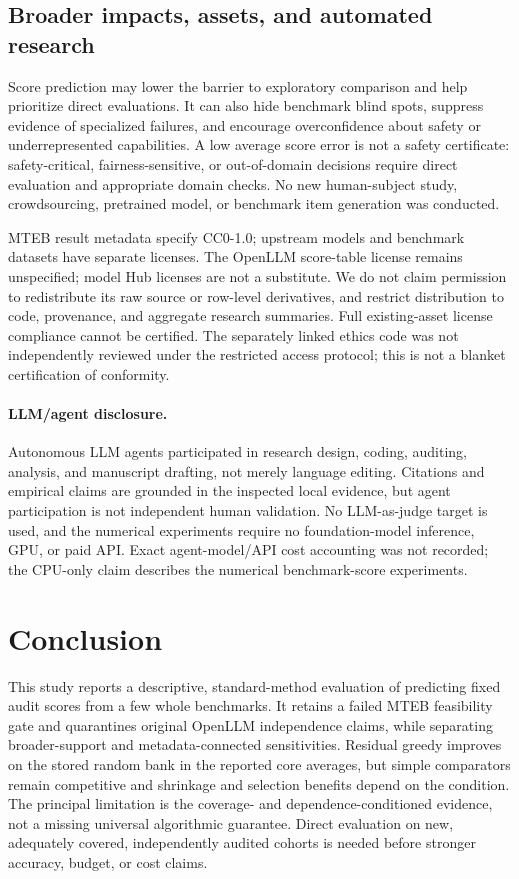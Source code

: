 \documentclass{article}
\begin{document}
\subsection{Broader impacts, assets, and automated research}\label{sec:ethics}
Score prediction may lower the barrier to exploratory comparison and help prioritize direct evaluations. It can also hide benchmark blind spots, suppress evidence of specialized failures, and encourage overconfidence about safety or underrepresented capabilities. A low average score error is not a safety certificate: safety-critical, fairness-sensitive, or out-of-domain decisions require direct evaluation and appropriate domain checks. No new human-subject study, crowdsourcing, pretrained model, or benchmark item generation was conducted.

MTEB result metadata specify CC0-1.0; upstream models and benchmark datasets have separate licenses. The OpenLLM score-table license remains unspecified; model Hub licenses are not a substitute. We do not claim permission to redistribute its raw source or row-level derivatives, and restrict distribution to code, provenance, and aggregate research summaries. Full existing-asset license compliance cannot be certified. The separately linked ethics code was not independently reviewed under the restricted access protocol; this is not a blanket certification of conformity.

\paragraph{LLM/agent disclosure.}\label{sec:agents}
Autonomous LLM agents participated in research design, coding, auditing, analysis, and manuscript drafting, not merely language editing. Citations and empirical claims are grounded in the inspected local evidence, but agent participation is not independent human validation. No LLM-as-judge target is used, and the numerical experiments require no foundation-model inference, GPU, or paid API. Exact agent-model/API cost accounting was not recorded; the CPU-only claim describes the numerical benchmark-score experiments.

\section{Conclusion}\label{sec:conclusion}
This study reports a descriptive, standard-method evaluation of predicting fixed audit scores from a few whole benchmarks. It retains a failed MTEB feasibility gate and quarantines original OpenLLM independence claims, while separating broader-support and metadata-connected sensitivities. Residual greedy improves on the stored random bank in the reported core averages, but simple comparators remain competitive and shrinkage and selection benefits depend on the condition. The principal limitation is the coverage- and dependence-conditioned evidence, not a missing universal algorithmic guarantee. Direct evaluation on new, adequately covered, independently audited cohorts is needed before stronger accuracy, budget, or cost claims.
\end{document}
